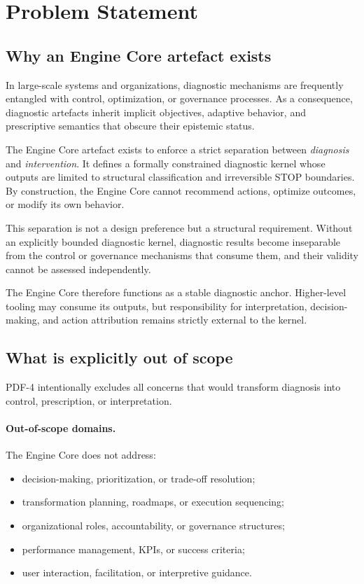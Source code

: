 ﻿\section{Problem Statement}

\subsection{Why an Engine Core artefact exists}

In large-scale systems and organizations, diagnostic mechanisms are frequently
entangled with control, optimization, or governance processes. As a consequence,
diagnostic artefacts inherit implicit objectives, adaptive behavior, and
prescriptive semantics that obscure their epistemic status.

The Engine Core artefact exists to enforce a strict separation between
\emph{diagnosis} and \emph{intervention}. It defines a formally constrained
diagnostic kernel whose outputs are limited to structural classification and
irreversible STOP boundaries. By construction, the Engine Core cannot recommend
actions, optimize outcomes, or modify its own behavior.

This separation is not a design preference but a structural requirement.
Without an explicitly bounded diagnostic kernel, diagnostic results become
inseparable from the control or governance mechanisms that consume them, and
their validity cannot be assessed independently.

The Engine Core therefore functions as a stable diagnostic anchor. Higher-level
tooling may consume its outputs, but responsibility for interpretation,
decision-making, and action attribution remains strictly external to the kernel.

\subsection{What is explicitly out of scope}

PDF-4 intentionally excludes all concerns that would transform diagnosis into
control, prescription, or interpretation.

\paragraph{Out-of-scope domains.}
The Engine Core does not address:
\begin{itemize}
  \item decision-making, prioritization, or trade-off resolution;
  \item transformation planning, roadmaps, or execution sequencing;
  \item organizational roles, accountability, or governance structures;
  \item performance management, KPIs, or success criteria;
  \item user interaction, facilitation, or interpretive guidance.
\end{itemize}

